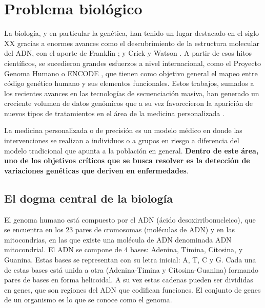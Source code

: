 \section{Problema biológico}

La biología, y en particular la genética, han tenido un lugar destacado en el siglo XX gracias a enormes avances como el descubrimiento de la estructura molecular del ADN, con el aporte de Franklin  \cite{FRANKLIN1953}; y Crick y Watson \cite{WATSON1953}. A partir de esos hitos científicos, se sucedieron grandes esfuerzos a nivel internacional, como el Proyecto Genoma Humano \cite{Consortium2001} o ENCODE \cite{Consortium2012}, que tienen como objetivo general el mapeo entre código genético humano y sus elementos funcionales. Estos trabajos, sumados a los recientes avances en las tecnologías de secuenciación masiva, han generado un creciente volumen de datos genómicos que a su vez favorecieron la aparición de nuevos tipos de tratamientos en el área de la medicina personalizada \cite{doi:10.1056/NEJMp1006304}. 

La medicina personalizada o de precisión es un modelo médico en donde las intervenciones se realizan a individuos o a grupos en riesgo a diferencia del modelo tradicional que apunta a la población en general. \textbf{Dentro de este área, uno de los objetivos críticos que se busca resolver es la detección de variaciones genéticas que deriven en enfermedades}.

\subsection{El dogma central de la biología}

El genoma humano está compuesto por el ADN (ácido desoxirribonucleico), que se encuentra en los 23 pares de cromosomas (moléculas de ADN) y en las mitocondrias, en las que existe una molécula de ADN denominada ADN mitocondrial. El ADN se compone de 4 bases: Adenina, Timina, Citosina, y Guanina. Estas bases se representan con su letra inicial: A, T, C y G. Cada una de estas bases está unida a otra (Adenina-Timina y Citosina-Guanina) formando pares de bases en forma helicoidal. A su vez estas cadenas pueden ser divididas en genes, que son regiones del ADN que codifican funciones. El conjunto de genes de un organismo es lo que se conoce como el genoma.

